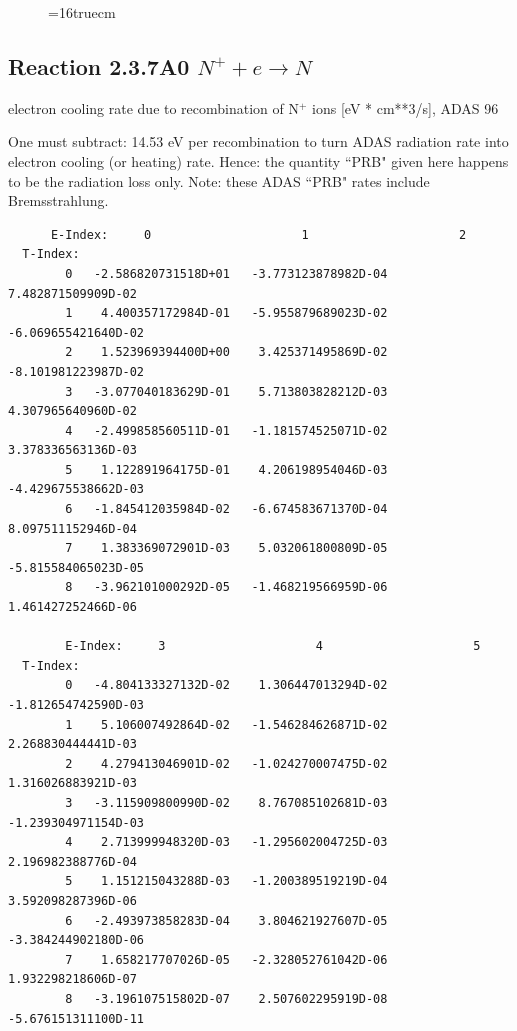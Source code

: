 \documentclass[12pt,dvipdfmx]{article}
\begin{document}
\begin{figure} \label{2.3.6rl}
\epsfxsize=16truecm
\end{figure}


\subsection{
  Reaction 2.3.7A0  $N^+ + e \rightarrow N   $
}
electron cooling rate due to recombination of N$^+$ ions [eV *
cm**3/s], ADAS 96

One must subtract: 14.53 eV per recombination to turn ADAS radiation
rate into electron cooling (or heating) rate. Hence: the quantity
``PRB" given here happens to be the radiation loss only. Note: these
ADAS ``PRB" rates include Bremsstrahlung.

\begin{small}\begin{verbatim}
      E-Index:     0                     1                     2
  T-Index:
        0   -2.586820731518D+01   -3.773123878982D-04    7.482871509909D-02
        1    4.400357172984D-01   -5.955879689023D-02   -6.069655421640D-02
        2    1.523969394400D+00    3.425371495869D-02   -8.101981223987D-02
        3   -3.077040183629D-01    5.713803828212D-03    4.307965640960D-02
        4   -2.499858560511D-01   -1.181574525071D-02    3.378336563136D-03
        5    1.122891964175D-01    4.206198954046D-03   -4.429675538662D-03
        6   -1.845412035984D-02   -6.674583671370D-04    8.097511152946D-04
        7    1.383369072901D-03    5.032061800809D-05   -5.815584065023D-05
        8   -3.962101000292D-05   -1.468219566959D-06    1.461427252466D-06

        E-Index:     3                     4                     5
  T-Index:
        0   -4.804133327132D-02    1.306447013294D-02   -1.812654742590D-03
        1    5.106007492864D-02   -1.546284626871D-02    2.268830444441D-03
        2    4.279413046901D-02   -1.024270007475D-02    1.316026883921D-03
        3   -3.115909800990D-02    8.767085102681D-03   -1.239304971154D-03
        4    2.713999948320D-03   -1.295602004725D-03    2.196982388776D-04
        5    1.151215043288D-03   -1.200389519219D-04    3.592098287396D-06
        6   -2.493973858283D-04    3.804621927607D-05   -3.384244902180D-06
        7    1.658217707026D-05   -2.328052761042D-06    1.932298218606D-07
        8   -3.196107515802D-07    2.507602295919D-08   -5.676151311100D-11


\end{verbatim}
\end{small}
\end{document}
